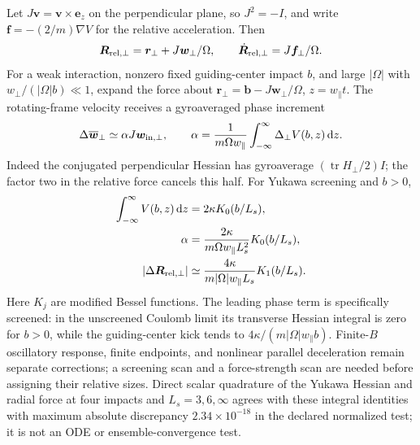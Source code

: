 \documentclass[11pt,letterpaper]{article}
\newcommand{\dd}{\mathrm d}
\newcommand{\tr}{\operatorname{tr}}
\begin{document}
Let $J\bm v=\bm v\times\bm e_z$ on the perpendicular plane, so
$J^2=-I$, and write $\bm f=-(2/m)\nabla V$ for the relative acceleration.
Then
\begin{equation}
 \bm R_{\rm rel,\perp}=\bm r_\perp+J\bm w_\perp/\Omega,
 \qquad \dot{\bm R}_{\rm rel,\perp}=J\bm f_\perp/\Omega.
\end{equation}
For a weak interaction, nonzero fixed guiding-center impact $b$, and large
$|\Omega|$ with $w_\perp/(|\Omega|b)\ll1$, expand the force about
$\bm r_\perp=\bm b-J\bm w_\perp/\Omega$, $z=w_\parallel t$.
The rotating-frame velocity receives a gyroaveraged phase increment
\begin{equation}
 \Delta\overline{\bm w}_\perp
 \simeq\alpha J\bm w_{\rm in,\perp},\qquad
 \alpha=\frac1{m\Omega w_\parallel}
       \int_{-\infty}^{\infty}\Delta_\perp V(b,z)\,\dd z.
 \label{eq:resonantphase}
\end{equation}
Indeed the conjugated perpendicular Hessian has gyroaverage
$(\tr H_\perp/2)I$; the factor two in the relative force cancels this
half. For Yukawa screening and $b>0$,
\begin{align}
 \int_{-\infty}^{\infty}V(b,z)\,\dd z&=2\kappa K_0(b/L_s),\\
 \alpha&=\frac{2\kappa}{m\Omega w_\parallel L_s^2}K_0(b/L_s),\\
 |\Delta\bm R_{\rm rel,\perp}|&\simeq
 \frac{4\kappa}{m|\Omega|w_\parallel L_s}K_1(b/L_s).
 \label{eq:screenedresonance}
\end{align}
Here $K_j$ are modified Bessel functions. The leading phase term is
specifically screened: in the unscreened Coulomb limit its transverse
Hessian integral is zero for $b>0$, while the guiding-center kick tends to
$4\kappa/(m|\Omega|w_\parallel b)$. Finite-$B$ oscillatory response,
finite endpoints, and nonlinear parallel deceleration remain separate
corrections; a screening scan and a force-strength scan are needed before
assigning their relative sizes. Direct scalar quadrature of the Yukawa
Hessian and radial force at four impacts and $L_s=3,6,\infty$ agrees with
these integral identities with maximum absolute discrepancy
$2.34\times10^{-18}$ in
the declared normalized test; it is not an ODE or ensemble-convergence test.
\end{document}
